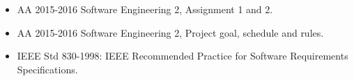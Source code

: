 \begin{itemize}
	\item AA 2015-2016 Software Engineering 2, Assignment 1 and 2.
	\item AA 2015-2016 Software Engineering 2, Project goal, schedule and rules.
	\item IEEE Std 830-1998: IEEE Recommended Practice for Software Requirements Specifications.
\end{itemize}